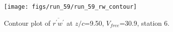 \begin{figure}[H]
\centering
\texttt{[image: figs/run\_59/run\_59\_rw\_contour]}
\caption{Contour plot of $\overline{r^\prime w^\prime}$ at $z/c$=9.50, $V_{free}$=30.9, station 6.}
\end{figure}


